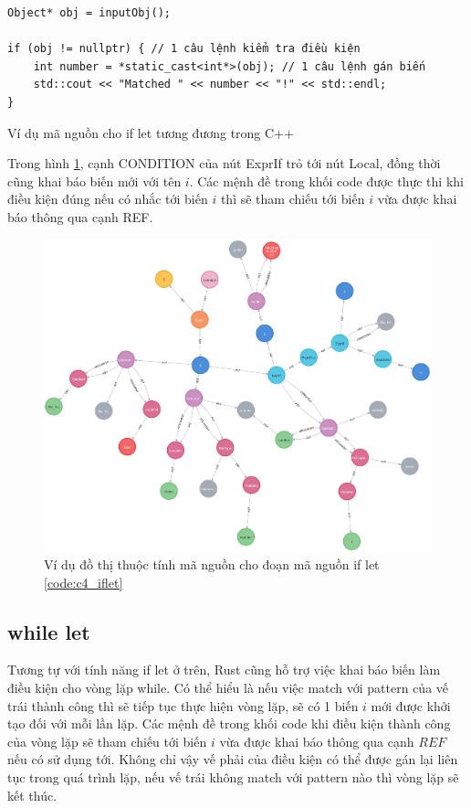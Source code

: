 \begin{listing}[H]
\begin{verbatim}
Object* obj = inputObj();

if (obj != nullptr) { // 1 câu lệnh kiểm tra điều kiện
    int number = *static_cast<int*>(obj); // 1 câu lệnh gán biến
    std::cout << "Matched " << number << "!" << std::endl;
}
\end{verbatim}
\caption{Ví dụ mã nguồn cho if let tương đương trong C++}
\label{code:c4_iflet_cpp}
\end{listing}

Trong hình \ref{img:c4_cpg_iflet}, cạnh CONDITION của nút ExprIf trỏ tới nút Local, đồng thời cũng khai báo biến mới với tên $i$. Các mệnh đề trong khối code được thực thi khi điều kiện đúng nếu có nhắc tới biến $i$ thì sẽ tham chiếu tới biến $i$ vừa được khai báo thông qua cạnh REF.

\begin{figure}[H]
\includegraphics[width=1\columnwidth]{figures/c4/c4_iflet.png}
\centering
\caption{Ví dụ đồ thị thuộc tính mã nguồn cho đoạn mã nguồn if let \ref{code:c4_iflet}}
\label{img:c4_cpg_iflet}
\end{figure}

\subsection{while let}

Tương tự với tính năng if let ở trên, Rust cũng hỗ trợ việc khai báo biến làm điều kiện cho vòng lặp while.
Có thể hiểu là nếu việc match với pattern của vế trái thành công thì sẽ tiếp tục thực hiện vòng lặp, sẽ có 1 biến $i$ mới được khởi tạo đối với mỗi lần lặp.
Các mệnh đề trong khối code khi điều kiện thành công của vòng lặp sẽ tham chiếu tới biến $i$ vừa được khai báo thông qua cạnh $REF$ nếu có sử dụng tới.
Không chỉ vậy vế phải của điều kiện có thể được gán lại liên tục trong quá trình lặp, nếu vế trái không match với pattern nào thì vòng lặp sẽ kết thúc.

